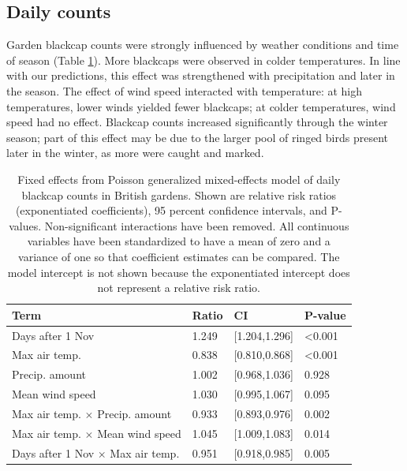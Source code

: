 \documentclass[a4paper, twoside]{templates/ociamthesis}
\begin{document}
\hypertarget{daily-counts-1}{%
\subsection{Daily counts}\label{daily-counts-1}}

Garden blackcap counts were strongly influenced by weather conditions and time of season (Table \ref{tab:daily-model-table}). More blackcaps were observed in colder temperatures. In line with our predictions, this effect was strengthened with precipitation and later in the season. The effect of wind speed interacted with temperature: at high temperatures, lower winds yielded fewer blackcaps; at colder temperatures, wind speed had no effect. Blackcap counts increased significantly through the winter season; part of this effect may be due to the larger pool of ringed birds present later in the winter, as more were caught and marked.

\begin{table}[t]

\caption{\label{tab:daily-model-table}Fixed effects from Poisson generalized mixed-effects model of daily blackcap counts in British gardens. Shown are relative risk ratios (exponentiated coefficients), 95 percent confidence intervals, and P-values. Non-significant interactions have been removed. All continuous variables have been standardized to have a mean of zero and a variance of one so that coefficient estimates can be compared. The model intercept is not shown because the exponentiated intercept does not represent a relative risk ratio.}
\centering
\begin{tabular}{l|l|l|l}
\hline
Term & Ratio & CI & P-value\\
\hline
Days after 1 Nov & 1.249 & [1.204,1.296] & <0.001\\
\hline
Max air temp. & 0.838 & [0.810,0.868] & <0.001\\
\hline
Precip. amount & 1.002 & [0.968,1.036] & 0.928\\
\hline
Mean wind speed & 1.030 & [0.995,1.067] & 0.095\\
\hline
Max air temp. $\times$ Precip. amount & 0.933 & [0.893,0.976] & 0.002\\
\hline
Max air temp. $\times$ Mean wind speed & 1.045 & [1.009,1.083] & 0.014\\
\hline
Days after 1 Nov $\times$ Max air temp. & 0.951 & [0.918,0.985] & 0.005\\
\hline
\end{tabular}
\end{table}
\end{document}
